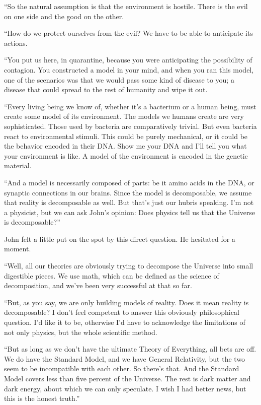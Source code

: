 \documentclass[12pt]{book}
\begin{document}
``So the natural assumption is that the environment is hostile. There is the evil on one side and the good on the other. 

``How do we protect ourselves from the evil? We have to be able to anticipate its actions. 

``You put us here, in quarantine, because you were anticipating the possibility of contagion. You constructed a model in your mind, and when you ran this model, one of the scenarios was that we would pass some kind of disease to you; a disease that could spread to the rest of humanity and wipe it out.

``Every living being we know of, whether it's a bacterium or a human being, must create some model of its environment. The models we humans create are very sophisticated. Those used by bacteria are comparatively trivial. But even bacteria react to environmental stimuli. This could be purely mechanical, or it could be the behavior encoded in their DNA. Show me your DNA and I'll tell you what your environment is like. A model of the environment is encoded in the genetic material.

``And a model is necessarily composed of parts: be it amino acids in the DNA, or synaptic connections in our brains. Since the model is decomposable, we assume that reality is decomposable as well. But that's just our hubris speaking. I'm not a physicist, but we can ask John's opinion: Does physics tell us that the Universe is decomposable?''

John felt a little put on the spot by this direct question. He hesitated for a moment.

``Well, all our theories are obviously trying to decompose the Universe into small digestible pieces. We use math, which can be defined as the science of decomposition, and we've been very successful at that so far.

``But, as you say, we are only building models of reality. Does it mean reality is decomposable? I don't feel competent to answer this obviously philosophical question. I'd like it to be, otherwise I'd have to acknowledge the limitations of not only physics, but the whole scientific method.

``But as long as we don't have the ultimate Theory of Everything, all bets are off. We do have the Standard Model, and we have General Relativity, but the two seem to be incompatible with each other. So there's that. And the Standard Model covers less than five percent of the Universe. The rest is dark matter and dark energy, about which we can only speculate. I wish I had better news, but this is the honest truth.''
\end{document}
